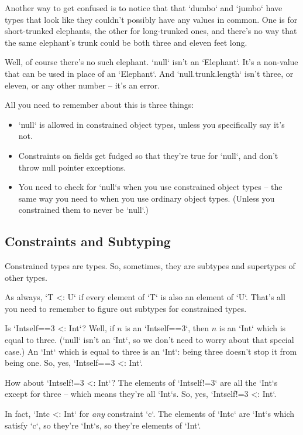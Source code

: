 Another way to get confused is to notice that that \xcd`dumbo` and \xcd`jumbo`
have types that look like they couldn't possibly have any values in common.
One is for short-trunked elephants, the other for long-trunked ones, and
there's no way that the same elephant's trunk could be both three and eleven
feet long.  

Well, of course there's no such elephant.  \xcd`null` isn't an \xcd`Elephant`.
It's a non-value that can be used in place of an \xcd`Elephant`.  And
\xcd`null.trunk.length` isn't three, or eleven, or any other number -- it's an
error.

All you need to remember about this is three things: 
\begin{itemize}
\item \xcd`null` is allowed in constrained object types, unless you
      specifically say it's not.
\item Constraints on fields get fudged so that they're true for \xcd`null`,
      and don't throw null pointer exceptions.
\item You need to check for \xcd`null`s when you use constrained object types --
      the same way you need to when you use ordinary object types.  (Unless
      you constrained them to never be \xcd`null`.)
\end{itemize}

\subsection{Constraints and Subtyping}

Constrained types are types. So, sometimes, they are subtypes and supertypes
of other types. 

As always, \xcd`T <: U` if every element of \xcd`T` is also an element of
\xcd`U`.    That's all you need to remember to figure out subtypes for
constrained types.

Is \xcd`Int{self==3} <: Int`?  Well, if {$n$} is an \xcd`Int{self==3}`, then
{$n$} is an \xcd`Int` which is equal to three. (\xcd`null` isn't an \xcd`Int`,
so we don't need to worry about that special case.)  An \xcd`Int` which is
equal to three is an \xcd`Int`: being three doesn't stop it from being one. 
So, yes, \xcd`Int{self==3} <: Int`.

How about \xcd`Int{self!=3} <: Int`?  The elements of 
\xcd`Int{self!=3}` are all the \xcd`Int`s except for three -- which means
they're all \xcd`Int`s.  So, yes, \xcd`Int{self!=3} <: Int`.

In fact, \xcd`Int{c} <: Int`  for {\em any} constraint \xcd`c`.
The elements of \xcd`Int{c}` are \xcd`Int`s which satisfy \xcd`c`, so they're
\xcd`Int`s, so they're elements of \xcd`Int`.  

